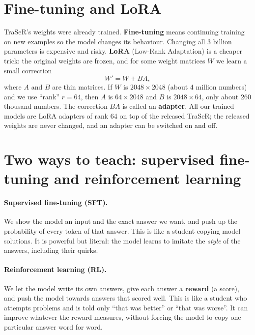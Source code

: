 \documentclass[11pt,openany]{book}
\begin{document}
\section{Fine-tuning and LoRA}
TraSeR's weights were already trained. \textbf{Fine-tuning} means continuing training on new examples so the model changes its
behaviour. Changing all 3 billion parameters is expensive and risky. \textbf{LoRA} (Low-Rank Adaptation) is a cheaper trick:
the original weights are frozen, and for some weight matrices $W$ we learn a small correction
\[ W' = W + B A, \]
where $A$ and $B$ are thin matrices. If $W$ is $2048\times 2048$ (about 4 million numbers) and we use ``rank'' $r=64$, then $A$ is
$64\times 2048$ and $B$ is $2048\times 64$, only about 260 thousand numbers. The correction $BA$ is called an \textbf{adapter}.
All our trained models are LoRA adapters of rank 64 on top of the released TraSeR; the released weights are never changed, and
an adapter can be switched on and off.

\section{Two ways to teach: supervised fine-tuning and reinforcement learning}
\paragraph{Supervised fine-tuning (SFT).} We show the model an input and the exact answer we want, and push up the probability of
every token of that answer. This is like a student copying model solutions. It is powerful but literal: the model learns to
imitate the \emph{style} of the answers, including their quirks.

\paragraph{Reinforcement learning (RL).} We let the model write its own answers, give each answer a \textbf{reward} (a score),
and push the model towards answers that scored well. This is like a student who attempts problems and is told only ``that was
better'' or ``that was worse''. It can improve whatever the reward measures, without forcing the model to copy one particular
answer word for word.
\end{document}
